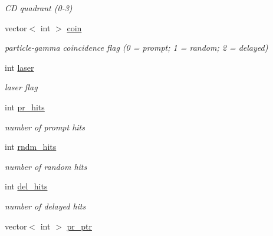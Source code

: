 \begin{DoxyCompactItemize}
\begin{DoxyCompactList}\small\item\em C\-D quadrant (0-\/3) \end{DoxyCompactList}\item 
\hypertarget{classmbevts_a306023f221da7deacd3abd790c714687}{vector$<$ int $>$ \hyperlink{classmbevts_a306023f221da7deacd3abd790c714687}{coin}}\label{classmbevts_a306023f221da7deacd3abd790c714687}

\begin{DoxyCompactList}\small\item\em particle-\/gamma coincidence flag (0 = prompt; 1 = random; 2 = delayed) \end{DoxyCompactList}\item 
\hypertarget{classmbevts_a78d94e595251e90308518a62ebfde561}{int \hyperlink{classmbevts_a78d94e595251e90308518a62ebfde561}{laser}}\label{classmbevts_a78d94e595251e90308518a62ebfde561}

\begin{DoxyCompactList}\small\item\em laser flag \end{DoxyCompactList}\item 
\hypertarget{classmbevts_a03061f3cb086b605ddebf77737fe5eb0}{int \hyperlink{classmbevts_a03061f3cb086b605ddebf77737fe5eb0}{pr\-\_\-hits}}\label{classmbevts_a03061f3cb086b605ddebf77737fe5eb0}

\begin{DoxyCompactList}\small\item\em number of prompt hits \end{DoxyCompactList}\item 
\hypertarget{classmbevts_a33b7c77a5fe645bfdcb8dc581769e3b7}{int \hyperlink{classmbevts_a33b7c77a5fe645bfdcb8dc581769e3b7}{rndm\-\_\-hits}}\label{classmbevts_a33b7c77a5fe645bfdcb8dc581769e3b7}

\begin{DoxyCompactList}\small\item\em number of random hits \end{DoxyCompactList}\item 
\hypertarget{classmbevts_a0780adbd09772dced2042b7067ace74e}{int \hyperlink{classmbevts_a0780adbd09772dced2042b7067ace74e}{del\-\_\-hits}}\label{classmbevts_a0780adbd09772dced2042b7067ace74e}

\begin{DoxyCompactList}\small\item\em number of delayed hits \end{DoxyCompactList}\item 
\hypertarget{classmbevts_ae0c8c3d4303a43f843cd3eda12cfb9e5}{vector$<$ int $>$ \hyperlink{classmbevts_ae0c8c3d4303a43f843cd3eda12cfb9e5}{pr\-\_\-ptr}}\label{classmbevts_ae0c8c3d4303a43f843cd3eda12cfb9e5}


\end{DoxyCompactItemize}
